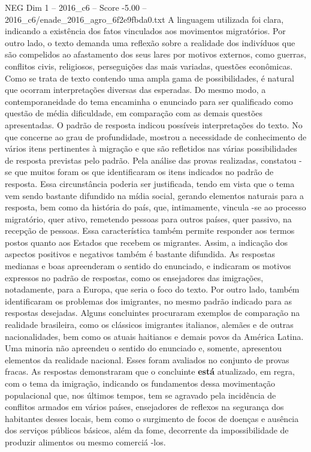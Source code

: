 \begin{textsample}{NEG Dim 1 – 2016\_c6 – Score -5.00 – 2016\_c6/enade\_2016\_agro\_6f2e9fbda0.txt}
A linguagem utilizada foi clara, indicando a existência dos fatos vinculados aos movimentos migratórios.
Por outro lado, o texto demanda uma reflexão sobre a realidade dos indivíduos que são compelidos ao afastamento dos seus lares por motivos externos, como guerras, conflitos civis, religiosos, perseguições das mais variadas, questões econômicas.
Como se trata de texto contendo uma ampla gama de possibilidades, é natural que ocorram interpretações diversas das esperadas.
Do mesmo modo, a contemporaneidade do tema encaminha o enunciado para ser qualificado como questão de média dificuldade, em comparação com as demais questões apresentadas.
O padrão de resposta indicou possíveis interpretações do texto.
No que concerne ao grau de profundidade, mostrou a necessidade de conhecimento de vários itens pertinentes à migração e que são refletidos nas várias possibilidades de resposta previstas pelo padrão.
Pela análise das provas realizadas, constatou -se que muitos foram os que identificaram os itens indicados no padrão de resposta.
Essa circunstância poderia ser justificada, tendo em vista que o tema vem sendo bastante difundido na mídia social, gerando elementos naturais para a resposta, bem como da história do país, que, intimamente, vincula -se ao processo migratório, quer ativo, remetendo pessoas para outros países, quer passivo, na recepção de pessoas.
Essa característica também permite responder aos termos postos quanto aos Estados que recebem os migrantes.
Assim, a indicação dos aspectos positivos e negativos também é bastante difundida.
As respostas medianas e boas apreenderam o sentido do enunciado, e indicaram os motivos expressos no padrão de respostas, como os ensejadores das imigrações, notadamente, para a Europa, que seria o foco do texto.
Por outro lado, também identificaram os problemas dos imigrantes, no mesmo padrão indicado para as respostas desejadas.
Alguns concluintes procuraram exemplos de comparação na realidade brasileira, como os clássicos imigrantes italianos, alemães e de outras nacionalidades, bem como os atuais haitianos e demais povos da América Latina.
Uma minoria não apreendeu o sentido do enunciado e, somente, apresentou elementos da realidade nacional.
Esses foram avaliados no conjunto de provas fracas.
As respostas demonstraram que o concluinte \textbf{está} atualizado, em regra, com o tema da imigração, indicando os fundamentos dessa movimentação populacional que, nos últimos tempos, tem se agravado pela incidência de conflitos armados em vários países, ensejadores de reflexos na segurança dos habitantes desses locais, bem como o surgimento de focos de doenças e ausência dos serviços públicos básicos, além da fome, decorrente da impossibilidade de produzir alimentos ou mesmo comerciá -los.

\end{textsample}

